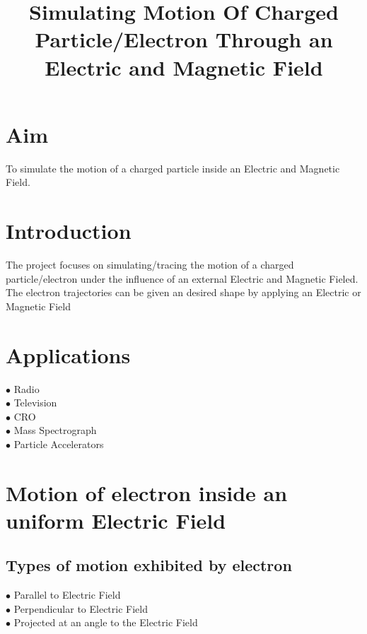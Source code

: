 \documentclass[a4paper,20pt,twoside]{report}
\begin{document}
	\title{Simulating Motion Of Charged Particle/Electron Through an Electric and Magnetic Field}
	\maketitle
	
	\section[15pt]{Aim}
	To simulate the motion of a charged particle inside an Electric and Magnetic Field.
	
	\section[15pt]{Introduction}
	The project focuses on simulating/tracing the motion of a charged particle/electron
	under the influence of an external Electric and Magnetic Fieled.
	The electron trajectories can be given an desired shape by applying an Electric or
	Magnetic Field
	
	\section[15ppt]{Applications}
		\begin{description}
			\item [$\bullet$ Radio]
			\item [$\bullet$ Television]
			\item [$\bullet$ CRO]
			\item [$\bullet$ Mass Spectrograph]
			\item [$\bullet$ Particle Accelerators]
	    \end{description}	
    
    \section{Motion of electron inside an uniform Electric Field}
    \subsection{Types of motion exhibited by electron}
    \begin{description}
    	\item [$\bullet$ Parallel to Electric Field]
    	\item [$\bullet$ Perpendicular to Electric Field]
    	\item [$\bullet$ Projected at an angle to the Electric Field]
    \end{description}
		
\end{document}
